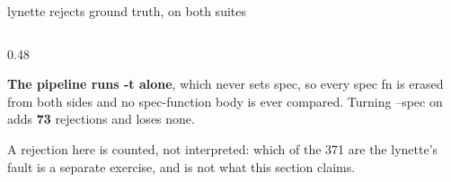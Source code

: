 \documentclass[aspectratio=169,10pt]{beamer}
\newcommand{\code}[1]{{\ttfamily #1}}
\begin{document}
\begin{frame}{lynette rejects ground truth, on both suites}
\begin{columns}[T]
\begin{column}{0.48\textwidth}
\begin{callout}[lgAccent]
\scriptsize
\textbf{The pipeline runs \code{-t} alone}, which never sets \code{spec}, so every
\code{spec fn} is erased from both sides and no spec-function body is ever compared. Turning
\code{--spec} on adds \textbf{73} rejections and loses none.
\end{callout}

\vspace{5pt}
{\scriptsize\color{lgGrey}A rejection here is counted, not interpreted: which of the 371 are the
lynette's fault is a separate exercise, and is not what this section claims.}
\end{column}
\end{columns}

\end{frame}
\end{document}
